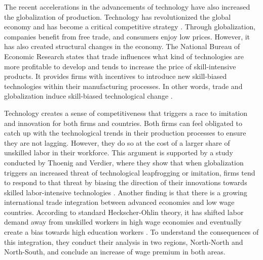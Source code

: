 \hspace{20pt}The recent accelerations in the advancements of technology have also increased the globalization of production. Technology has revolutionized the global economy and has become a critical competitive strategy \cite{lamba2009role}. Through globalization, companies benefit from free trade, and consumers enjoy low prices. However, it has also created structural changes in the economy. The National Bureau of Economic Research states that trade influences what kind of technologies are more profitable to develop and tends to increase the price of skill-intensive products. It provides firms with incentives to introduce new skill-biased technologies within their manufacturing processes. In other words, trade and globalization induce skill-biased technological change \cite{acemoglu_2003}.

Technology creates a sense of competitiveness that triggers a race to imitation and innovation for both firms and countries. Both firms can feel obligated to catch up with the technological trends in their production processes to ensure they are not lagging. However, they do so at the cost of a larger share of unskilled labor in their workforce. This argument is supported by a study conducted by Thoenig and Verdier, where they show that when globalization triggers an increased threat of technological leapfrogging or imitation, firms tend to respond to that threat by biasing the direction of their innovations towards skilled labor-intensive technologies \cite{thoenig2003theory}. Another finding is that there is a  growing international trade integration between advanced economies and low wage countries. According to standard Heckscher-Ohlin theory, it has shifted labor demand away from unskilled workers in high wage economies and eventually create a bias towards high education workers \cite{leamerheckscher}. To understand the consequences of this integration, they conduct their analysis in two regions, North-North and North-South, and conclude an increase of wage premium in both areas.

